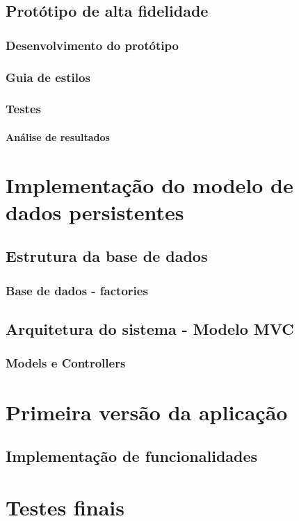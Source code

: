 \documentclass[11pt, twoside]{report}
\begin{document}
	\section{Protótipo de alta fidelidade}
	\subsection{Desenvolvimento do protótipo}
	\subsection{Guia de estilos}
	\subsection{Testes}
	\subsubsection{Análise de resultados}
	
	\chapter{Implementação do modelo de dados persistentes}
	\section{Estrutura da base de dados}
	\subsection{Base de dados - factories}
	\section{Arquitetura do sistema - Modelo MVC}
	\subsection{Models e Controllers}
	
	\chapter{Primeira versão da aplicação}
	\section{Implementação de funcionalidades}
	
	\chapter{Testes finais}
\end{document}
